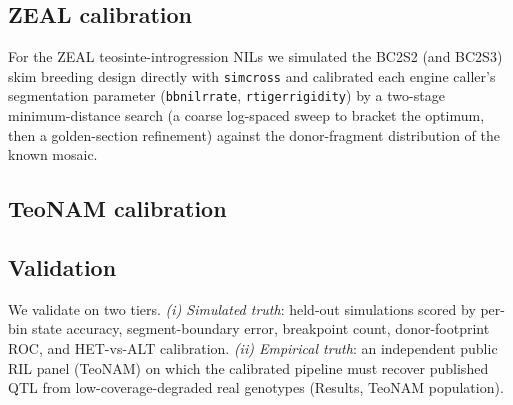 \documentclass[9pt,twocolumn,twoside]{rilabRxiv}
\newcommand{\bbnil}{\texttt{bbnil}\xspace}
\newcommand{\rtiger}{\texttt{rtiger}\xspace}
\begin{document}
\subsection{ZEAL calibration}
For the ZEAL teosinte-introgression NILs we simulated the BC2S2 (and BC2S3) skim
breeding design directly with \texttt{simcross} and calibrated each engine caller's
segmentation parameter (\bbnil \texttt{rrate}, \rtiger \texttt{rigidity}) by a two-stage
minimum-distance search (a coarse log-spaced sweep to bracket the optimum, then a
golden-section refinement) against the donor-fragment distribution of the known mosaic.

\subsection{TeoNAM calibration}

\subsection{Validation}
We validate on two tiers. \emph{(i) Simulated truth}: held-out simulations scored by
per-bin state accuracy, segment-boundary error, breakpoint count, donor-footprint ROC,
and HET-vs-ALT calibration. \emph{(ii) Empirical truth}: an independent public RIL
panel (TeoNAM) on which the calibrated pipeline must recover published QTL from
low-coverage-degraded real genotypes (Results, TeoNAM population).
\end{document}
